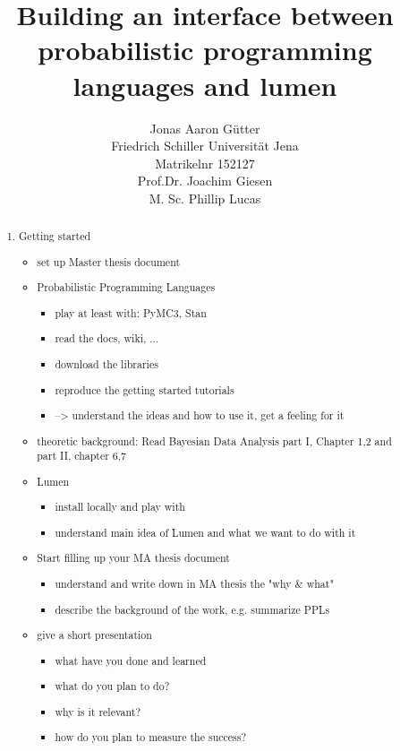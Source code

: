 \documentclass{article}
\title{Building an interface between probabilistic programming languages and lumen}
\author{Jonas Aaron Gütter  \\
	Friedrich Schiller Universität Jena  \\
    Matrikelnr 152127 \\
    Prof.Dr. Joachim Giesen \\
    M. Sc. Phillip Lucas
	}
\begin{document}
\maketitle

\begin{abstract}


\begin{enumerate}
   \item Getting started
        \begin{itemize}
        \item set up Master thesis document
        \item Probabilistic Programming Languages
        	\begin{itemize}
		\item play at least with: PyMC3, Stan
		\item read the docs, wiki, ...
		\item download the libraries
		\item reproduce the getting started tutorials
		\item --> understand the ideas and how to use it, get a feeling for it
	\end{itemize}
        \item theoretic background: Read Bayesian Data Analysis part I, Chapter 1,2 and part II, chapter 6,7
        \item Lumen
	\begin{itemize}
		\item install locally and play with
		\item understand main idea of Lumen and what we want to do with it
	\end{itemize}
       \item Start filling up your MA thesis document
	\begin{itemize}
		\item understand and write down in MA thesis the "why \& what"
		\item describe the background of the work, e.g. summarize PPLs
	\end{itemize}
      \item give a short presentation
	\begin{itemize}
		\item what have you done and learned
		\item what do you plan to do?
		\item why is it relevant?
		\item how do you plan to measure the success?
	\end{itemize}	

\end{itemize}
\end{enumerate}
\end{abstract}
\end{document}
